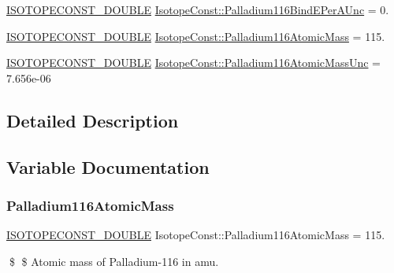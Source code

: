 \begin{DoxyCompactItemize}
\mbox{\hyperlink{group___isotope_const-_macros_ga8f45a7272ce02c0b4c65c44636ed719a}{I\+S\+O\+T\+O\+P\+E\+C\+O\+N\+S\+T\+\_\+\+D\+O\+U\+B\+LE}} \mbox{\hyperlink{group___isotope_const-_palladium-_pd116_ga7a5e0923a5682ca2502b037608f95014}{Isotope\+Const\+::\+Palladium116\+Bind\+E\+Per\+A\+Unc}} = 0.
\item 
\mbox{\hyperlink{group___isotope_const-_macros_ga8f45a7272ce02c0b4c65c44636ed719a}{I\+S\+O\+T\+O\+P\+E\+C\+O\+N\+S\+T\+\_\+\+D\+O\+U\+B\+LE}} \mbox{\hyperlink{group___isotope_const-_palladium-_pd116_ga8276695965ad65aaee7f6d551e2b647c}{Isotope\+Const\+::\+Palladium116\+Atomic\+Mass}} = 115.
\item 
\mbox{\hyperlink{group___isotope_const-_macros_ga8f45a7272ce02c0b4c65c44636ed719a}{I\+S\+O\+T\+O\+P\+E\+C\+O\+N\+S\+T\+\_\+\+D\+O\+U\+B\+LE}} \mbox{\hyperlink{group___isotope_const-_palladium-_pd116_gac77b75cf126df47473f38dc2c22f4d6c}{Isotope\+Const\+::\+Palladium116\+Atomic\+Mass\+Unc}} = 7.\+656e-\/06
\end{DoxyCompactItemize}


\subsection{Detailed Description}


\subsection{Variable Documentation}
\mbox{\label{group___isotope_const-_palladium-_pd116_ga8276695965ad65aaee7f6d551e2b647c}} 
\subsubsection{\texorpdfstring{Palladium116\+Atomic\+Mass}{Palladium116AtomicMass}}
{\footnotesize\ttfamily \mbox{\hyperlink{group___isotope_const-_macros_ga8f45a7272ce02c0b4c65c44636ed719a}{I\+S\+O\+T\+O\+P\+E\+C\+O\+N\+S\+T\+\_\+\+D\+O\+U\+B\+LE}} Isotope\+Const\+::\+Palladium116\+Atomic\+Mass = 115.}

\$ \$ Atomic mass of Palladium-\/116 in amu. \mbox{\label{group___isotope_const-_palladium-_pd116_gac77b75cf126df47473f38dc2c22f4d6c}} 
